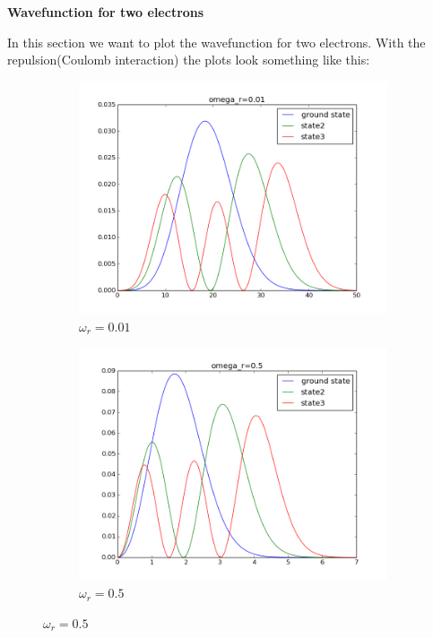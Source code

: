 \documentclass[11pt, a4 paper]{report}
\newenvironment{tabbed}{\begin{addmargin}{0.1cm}}{\end{addmargin}}
\newcommand{\sectiontitle}[1]{\begin{center} \Large\textbf{{#1}} \end{center}}
\begin{document}
\sectiontitle{Wavefunction for two electrons}
    \begin{tabbed}
    In this section we want to plot the wavefunction for two electrons. With the repulsion(Coulomb interaction) the plots look something like this:
    \end{tabbed}
    \begin{figure}[H]
        \captionsetup[subfigure]{labelformat=empty}
        \begin{subfigure}[b!]{0.6\textwidth}
            \centering
            \includegraphics[width=\textwidth]{or001.png}
            \caption{$\omega_r=0.01$}
        \end{subfigure}
        \begin{subfigure}[b!]{0.6\textwidth}
            \centering
            \includegraphics[width=\textwidth]{or05.png}
            \caption{$\omega_r=0.5$}
        \end{subfigure}
    \end{figure}
\end{document}
